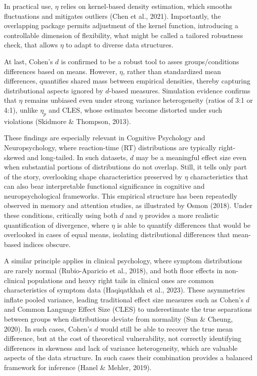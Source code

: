 \documentclass[
  12pt,
  a4paper,
  DIV=11,
  numbers=noendperiod]{scrartcl}
\begin{document}
In practical use, \(\eta\) relies on kernel-based density estimation,
which smooths fluctuations and mitigates outliers (Chen et al., 2021).
Importantly, the overlapping package permits adjustment of the kernel
function, introducing a controllable dimension of flexibility, what
might be called a tailored robustness check, that allows \(\eta\) to
adapt to diverse data structures.

At last, Cohen's \(d\) is confirmed to be a robust tool to asses
groups/conditions differences based on means. However, \(\eta\), rather
than standardized mean differences, quantifies shared mass between
empirical densities, thereby capturing distributional aspects ignored by
\(d\)-based measures. Simulation evidence confirms that \(\eta\) remains
unbiased even under strong variance heterogeneity (ratios of 3:1 or
4:1), unlike \(\eta_p\) and CLES, whose estimates become distorted under
such violations (Skidmore \& Thompson, 2013).

These findings are especially relevant in Cognitive Psychology and
Neuropsychology, where reaction-time (RT) distributions are typically
right-skewed and long-tailed. In such datasets, \(d\) may be a
meaningful effect size even when substantial portions of distributions
do not overlap. Still, it tells only part of the story, overlooking
shape characteristics preserved by \(\eta\) characteristics that can
also bear interpretable functional significance in cognitive and
neuropsychological frameworks. This empirical structure has been
repeatedly observed in memory and attention studies, as illustrated by
Osmon (2018). Under these conditions, critically using both \(d\) and
\(\eta\) provides a more realistic quantification of divergence, where
\(\eta\) is able to quantify differences that would be overlooked in
cases of equal means, isolating distributional differences that
mean-based indices obscure.

A similar principle applies in clinical psychology, where symptom
distributions are rarely normal (Rubio-Aparicio et al., 2018), and both
floor effects in non-clinical populations and heavy right tails in
clinical ones are common characteristics of symptom data (Haqiqatkhah et
al., 2023). These asymmetries inflate pooled variance, leading
traditional effect size measures such as Cohen's \(d\) and Common
Language Effect Size (CLES) to underestimate the true separations
between groups when distributions deviate from normality (Sun \& Cheung,
2020). In such cases, Cohen's \(d\) would still be able to recover the
true mean difference, but at the cost of theoretical vulnerability, not
correctly identifying differences in skewness and lack of variance
heterogeneity, which are valuable aspects of the data structure. In such
cases their combination provides a balanced framework for inference
(Hanel \& Mehler, 2019).
\end{document}
